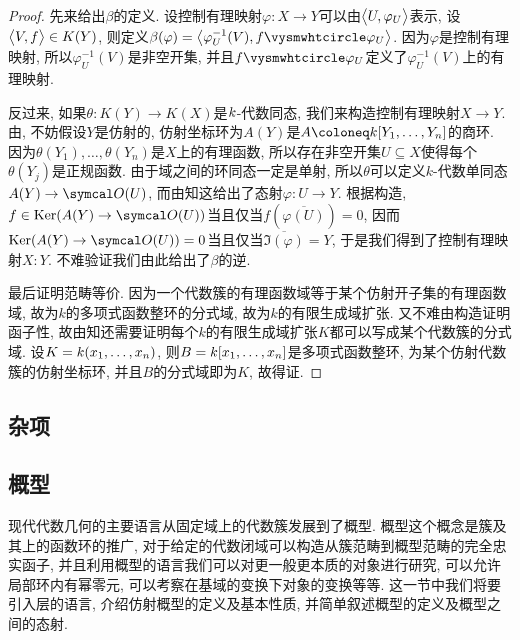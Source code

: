 \begin{proof}
  先来给出$\beta$的定义. 设控制有理映射$\varphi\colon X\to Y$可以由$\lrbig<>{U, \varphi_U}$表示, 设$\lrbig<>{V, f}\in K(Y)$, 则定义$\beta(\varphi)=\lrbig<>{\varphi_{U}^{-1}(V), f\composite \varphi_U}$. 因为$\varphi$是控制有理映射, 所以$\varphi_{U}^{-1}(V)$是非空开集, 并且$f\composite \varphi_U$定义了$\varphi_{U}^{-1}(V)$上的有理映射.

  反过来, 如果$\theta\colon K(Y)\to K(X)$是$\kk$-代数同态, 我们来构造控制有理映射$X\to Y$. 由, 不妨假设$Y$是仿射的, 仿射坐标环为$A(Y)$是$A\coloneq \kk [Y_1, \dotsc, Y_n]$的商环. 因为$\theta(Y_1), \dotsc, \theta(Y_n)$是$X$上的有理函数, 所以存在非空开集$U\subseteq X$使得每个$\theta(Y_j)$是正规函数. 由于域之间的环同态一定是单射, 所以$\theta$可以定义$k$-代数单同态$A(Y)\to \OO (U)$, 而由知这给出了态射$\varphi\colon U\to Y$. 根据构造, $f\in\Ker (A(Y)\to \OO (U))$当且仅当$f(\overline{\varphi (U)})=0$, 因而$\Ker (A(Y)\to \OO (U))=0$当且仅当$\overline{\Im (\varphi)}=Y$, 于是我们得到了控制有理映射$X\colon Y$. 不难验证我们由此给出了$\beta$的逆.

  最后证明范畴等价. 因为一个代数簇的有理函数域等于某个仿射开子集的有理函数域, 故为$k$的多项式函数整环的分式域, 故为$k$的有限生成域扩张. 又不难由构造证明函子性, 故由知还需要证明每个$k$的有限生成域扩张$K$都可以写成某个代数簇的分式域. 设$K=\kk (x_1, \dotsc, x_n)$, 则$B=\kk [x_1, \dotsc, x_n]$是多项式函数整环, 为某个仿射代数簇的仿射坐标环, 并且$B$的分式域即为$K$, 故得证.
\end{proof}

\subsection{杂项}


\subsection{概型}\label{subsec:ag-affinescheme}

现代代数几何的主要语言从固定域上的代数簇发展到了概型. 概型这个概念是簇及其上的函数环的推广, 对于给定的代数闭域可以构造从簇范畴到概型范畴的完全忠实函子, 并且利用概型的语言我们可以对更一般更本质的对象进行研究, 可以允许局部环内有幂零元, 可以考察在基域的变换下对象的变换等等. 这一节中我们将要引入层的语言, 介绍仿射概型的定义及基本性质, 并简单叙述概型的定义及概型之间的态射.


